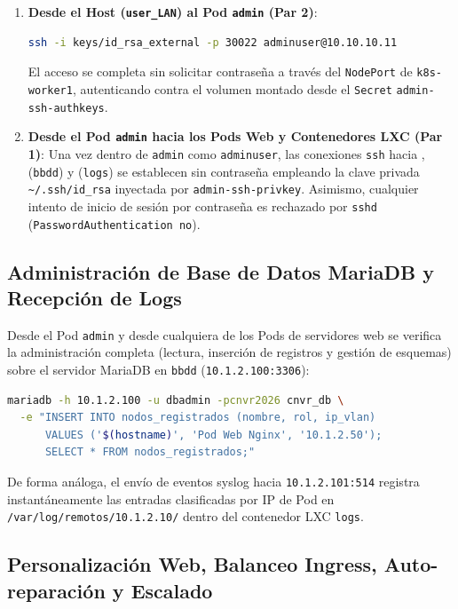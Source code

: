 \begin{enumerate}
  \item \textbf{Desde el Host (\texttt{user\_LAN}) al Pod \texttt{admin} (Par 2)}:
\begin{lstlisting}[language=bash]
ssh -i keys/id_rsa_external -p 30022 adminuser@10.10.10.11
\end{lstlisting}
  El acceso se completa sin solicitar contraseña a través del \texttt{NodePort} de \texttt{k8s-worker1}, autenticando contra el volumen montado desde el \texttt{Secret} \texttt{admin-ssh-authkeys}.
  \item \textbf{Desde el Pod \texttt{admin} hacia los Pods Web y Contenedores LXC (Par 1)}:
  Una vez dentro de \texttt{admin} como \texttt{adminuser}, las conexiones \texttt{ssh} hacia ,  (\texttt{bbdd}) y  (\texttt{logs}) se establecen sin contraseña empleando la clave privada \texttt{\textasciitilde/.ssh/id\_rsa} inyectada por \texttt{admin-ssh-privkey}. Asimismo, cualquier intento de inicio de sesión por contraseña es rechazado por \texttt{sshd} (\texttt{PasswordAuthentication no}).
\end{enumerate}

\subsection{Administración de Base de Datos MariaDB y Recepción de Logs}

Desde el Pod \texttt{admin} y desde cualquiera de los Pods de servidores web se verifica la administración completa (lectura, inserción de registros y gestión de esquemas) sobre el servidor MariaDB en \texttt{bbdd} (\texttt{10.1.2.100:3306}):
\begin{lstlisting}[language=bash]
mariadb -h 10.1.2.100 -u dbadmin -pcnvr2026 cnvr_db \
  -e "INSERT INTO nodos_registrados (nombre, rol, ip_vlan)
      VALUES ('$(hostname)', 'Pod Web Nginx', '10.1.2.50');
      SELECT * FROM nodos_registrados;"
\end{lstlisting}
De forma análoga, el envío de eventos syslog hacia \texttt{10.1.2.101:514} registra instantáneamente las entradas clasificadas por IP de Pod en \texttt{/var/log/remotos/10.1.2.10/} dentro del contenedor LXC \texttt{logs}.

\subsection{Personalización Web, Balanceo Ingress, Auto-reparación y Escalado}

